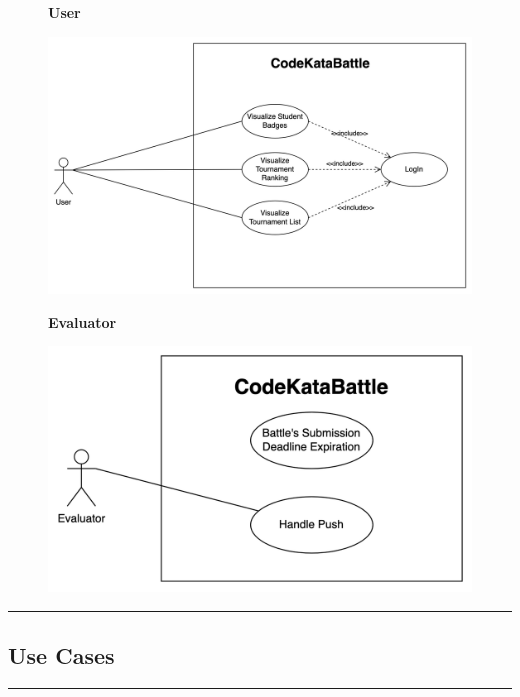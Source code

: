 \documentclass{Configuration_Files/Template}
\begin{document}
\begin{figure}[H]
\textbf{User}\par\medskip
\includegraphics[scale = 0.45]{Images/UseCaseDiagrams/UserUseCaseDiagram.png}\\
\centering
\end{figure}
\begin{figure}[H]
\textbf{Evaluator}\par\medskip
\includegraphics[scale = 0.45]{Images/UseCaseDiagrams/CKB_Autonomous_UseCaseDiagram.png}\\
\centering
\end{figure}

{\color{bluepoli}\rule{\linewidth}{0.1pt}}

\subsection{Use Cases}

{\color{bluepoli}\rule{\linewidth}{0.1pt}}
\end{document}
